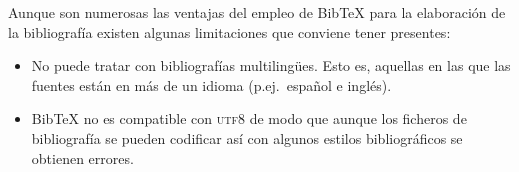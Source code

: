 \documentclass[11pt,a4paper]{article}
\begin{document}
Aunque son numerosas las ventajas del empleo de Bib\TeX{} para la elaboración de la bibliografía existen algunas limitaciones que conviene tener presentes:
\begin{itemize}
	\item No puede tratar con bibliografías multilingües. Esto es, aquellas en las que las fuentes están en más de un idioma (p.ej.\ español e inglés).
	
	\item Bib\TeX{} no es compatible con \textsc{utf8} de modo que aunque los ficheros de bibliografía se pueden codificar así con algunos estilos bibliográficos se obtienen errores.
\end{itemize}





\renewcommand{\refname}{Bibliografía} %



%

%


\nocite{*} %

\end{document}
